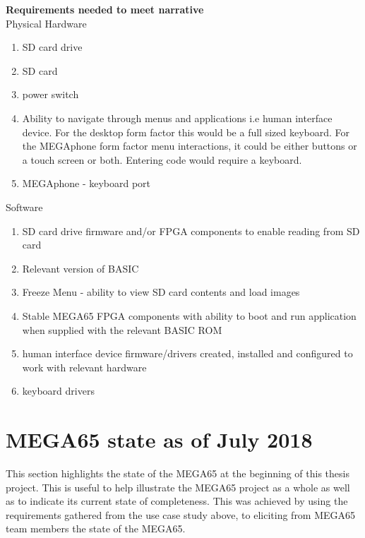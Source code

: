 \textbf{Requirements needed to meet narrative}\\
Physical Hardware
\begin{enumerate}
\item SD card drive
\item SD card
\item power switch
\item Ability to navigate through menus and applications i.e human interface device. For the desktop form factor this would be a full sized keyboard. For the MEGAphone form factor menu interactions, it could be either buttons or a touch screen or both. Entering code would require a keyboard.
\item MEGAphone - keyboard port
\end{enumerate}

Software\\
\begin{enumerate}
\item SD card drive firmware and/or FPGA components to enable reading from SD card
\item Relevant version of BASIC 
\item Freeze Menu - ability to view SD card contents and load images
\item Stable MEGA65 FPGA components with ability to boot and run application when supplied with the relevant BASIC ROM
\item human interface device firmware/drivers created, installed and configured to work with relevant hardware
\item keyboard drivers
\end{enumerate}

\section{MEGA65 state as of July 2018}
This section highlights the state of the MEGA65 at the beginning of this thesis project. This is useful to help illustrate the MEGA65 project as a whole as well as to indicate its current state of completeness. This was achieved by using the requirements gathered from the use case study above, to eliciting from MEGA65 team members the state of the MEGA65.

